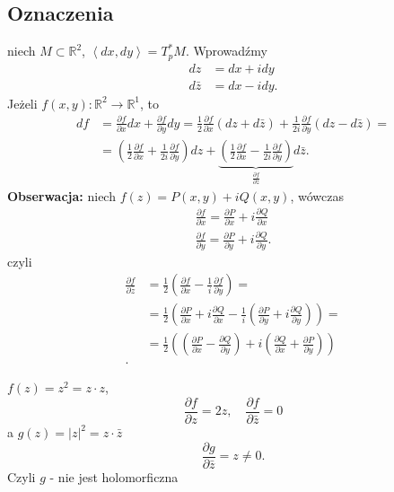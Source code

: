 \documentclass[../main.tex]{subfiles}
\begin{document}
    \subsection{Oznaczenia}
    niech $M\subset\mathbb{R}^2$, $\left<dx, dy \right> = T_p^* M$. Wprowadźmy
    \begin{align*}
        dz &= dx + idy\\
        d\bar{z} &= dx - idy
    .\end{align*}
    Jeżeli $f(x,y): \mathbb{R}^2\to \mathbb{R}^1$, to
    \begin{align*}
        df &= \frac{\partial f}{\partial x} dx + \frac{\partial f}{\partial y} dy = \frac{1}{2} \frac{\partial f}{\partial x} \left( dz + d\bar{z} \right) + \frac{1}{2i} \frac{\partial f}{\partial y} \left( dz - d\bar{z} \right) =\\
        &= \left( \frac{1}{2}\frac{\partial f}{\partial x} + \frac{1}{2i}\frac{\partial f}{\partial y}  \right) dz + \underbrace{\left( \frac{1}{2}\frac{\partial f}{\partial x} - \frac{1}{2i}\frac{\partial f}{\partial y}  \right)}_{\frac{\partial f}{\partial \bar{z}} }d\bar{z}
    .\end{align*}
\textbf{Obserwacja:} niech $f(z) = P(x,y) + i Q(x,y)$, wówczas
\begin{align*}
    \frac{\partial f}{\partial x} = \frac{\partial P}{\partial x} + i \frac{\partial Q}{\partial x} \\ \frac{\partial f}{\partial y} = \frac{\partial P}{\partial y} + i \frac{\partial Q}{\partial y}
.\end{align*}
czyli
\begin{align*}
    \frac{\partial f}{\partial \bar{z}} &= \frac{1}{2} \left( \frac{\partial f}{\partial x} - \frac{1}{i} \frac{\partial f}{\partial y}  \right) = \\
    &= \frac{1}{2} \left( \frac{\partial P}{\partial x} + i \frac{\partial Q}{\partial x} - \frac{1}{i}\left( \frac{\partial P}{\partial y} + i \frac{\partial Q}{\partial y}  \right)  \right)  =\\
    &= \frac{1}{2} \left(\left( \frac{\partial P}{\partial x}  - \frac{\partial Q}{\partial y}  \right) + i \left(\frac{\partial Q}{\partial x} + \frac{\partial P}{\partial y}\right)\right)  \\
.\end{align*}
\begin{przyklad}
    $f(z) = z^2 = z\cdot z$,\\
    \[
        \frac{\partial f}{\partial z} = 2z,\quad \frac{\partial f}{\partial \bar{z}} = 0
    \]
    a $g(z) = |z|^2 = z\cdot \bar{z}$
    \[
        \frac{\partial g}{\partial \bar{z}} = z \neq 0
    .\] Czyli $g$ - nie jest holomorficzna
\end{przyklad}
\end{document}
